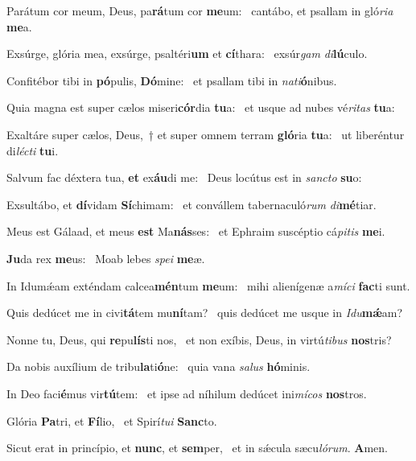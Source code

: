 \item Parátum cor meum, Deus, pa\textbf{rá}tum cor \textbf{me}um:~\psstar{} cantábo, et psallam in gló\textit{ria} \textbf{me}a.
\item Exsúrge, glória mea, exsúrge, psaltéri\textbf{um} et \textbf{cí}thara:~\psstar{} exsúr\textit{gam} \textit{di}\textbf{lú}culo.
\item Confitébor tibi in \textbf{pó}pulis, \textbf{Dó}mine:~\psstar{} et psallam tibi in \textit{nati}\textbf{ó}nibus.
\item Quia magna est super cælos miseri\textbf{cór}dia \textbf{tu}a:~\psstar{} et usque ad nubes vé\textit{ritas} \textbf{tu}a:
\item Exaltáre super cælos, Deus,~† et super omnem terram \textbf{gló}ria \textbf{tu}a:~\psstar{} ut liberéntur di\textit{lécti} \textbf{tu}i.
\item Salvum fac déxtera tua, \textbf{et} ex\textbf{áu}di me:~\psstar{} Deus locútus est in \textit{sancto} \textbf{su}o:
\item Exsultábo, et \textbf{dí}vidam \textbf{Sí}chimam:~\psstar{} et convállem tabernaculó\textit{rum} \textit{di}\textbf{mé}tiar.
\item Meus est Gálaad, et meus \textbf{est} Ma\textbf{nás}ses:~\psstar{} et Ephraim suscéptio cá\textit{pitis} \textbf{me}i.
\item \textbf{Ju}da rex \textbf{me}us:~\psstar{} Moab lebes \textit{spei} \textbf{me}æ.
\item In Idumǽam exténdam calcea\textbf{mén}tum \textbf{me}um:~\psstar{} mihi alienígenæ a\textit{míci} \textbf{fac}ti sunt.
\item Quis dedúcet me in civi\textbf{tá}tem mu\textbf{ní}tam?~\psstar{} quis dedúcet me usque in \textit{Idu}\textbf{mǽ}am?
\item Nonne tu, Deus, qui \textbf{re}pu\textbf{lís}ti nos,~\psstar{} et non exíbis, Deus, in virtú\textit{tibus} \textbf{nos}tris?
\item Da nobis auxílium de tribu\textbf{la}ti\textbf{ó}ne:~\psstar{} quia vana \textit{salus} \textbf{hó}minis.
\item In Deo faci\textbf{é}mus vir\textbf{tú}tem:~\psstar{} et ipse ad níhilum dedúcet ini\textit{mícos} \textbf{nos}tros.
\item Glória \textbf{Pa}tri, et \textbf{Fí}lio,~\psstar{} et Spirí\textit{tui} \textbf{Sanc}to.
\item Sicut erat in princípio, et \textbf{nunc}, et \textbf{sem}per,~\psstar{} et in sǽcula sæcu\textit{lórum}. \textbf{A}men.